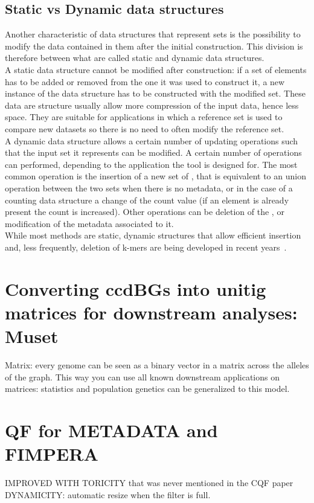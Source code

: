 \subsection{Static vs Dynamic data structures}
\label{sec:staticdynamic}
Another characteristic of data structures that represent \kmer sets is the possibility to modify the data contained in them after the initial construction. This division is therefore between what are called static and dynamic data structures. \\
A static data structure cannot be modified after construction: if a set of elements has to be added or removed from the one it was used to construct it, a new instance of the data structure has to be constructed with the modified set. These data are structure usually allow more compression of the input data, hence less space. They are suitable for applications in which a reference set is used to compare new datasets so there is no need to often modify the reference set.\\
A dynamic data structure allows a certain number of updating operations such that the input set it represents can be modified. A certain number of operations can performed, depending to the application the tool is designed for. The most common operation is the insertion of a new set of \kmers, that is equivalent to an union operation between the two sets when there is no metadata, or in the case of a counting data structure a change of the count value (if an element is already present the count is increased). Other operations can be deletion of the \kmer, or modification of the metadata associated to it. \\
While most methods are static, dynamic structures that allow efficient insertion and, less frequently, deletion of k-mers are being developed in recent years~\cite{marchet2024kmersets}.


\section{Converting ccdBGs into unitig matrices for downstream analyses: Muset}
Matrix: every genome can be seen as a binary vector in a matrix across the alleles of the graph. This way you can use all known downstream applications on matrices: statistics and population genetics can be generalized to this model.

\section{QF for METADATA and FIMPERA}
\label{sec:qf}
IMPROVED WITH TORICITY that was never mentioned in the CQF paper
DYNAMICITY: automatic resize when the filter is full.
